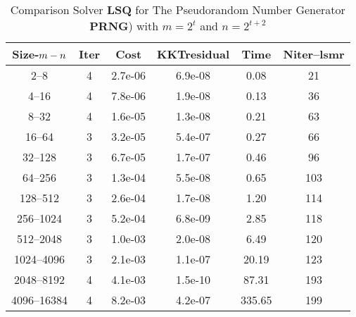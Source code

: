 \documentclass[letterpaper,12pt,oneside,final]{book}
\begin{document}
\begin{table}
\caption{Comparison Solver {\bf LSQ}  for  The Pseudorandom Number Generator {\bf PRNG}) with $m=2^{t}$ and $n=2^{t+2}$}  
\begin{center}
\begin{tabular}{|*{6}{c}|} \hline
Size-$m\--n$ & \multicolumn{1}{c}{Iter} & \multicolumn{1}{c}{Cost}& \multicolumn{1}{c}{KKTresidual} & \multicolumn{1}{c}{Time} & \multicolumn{1}{c|}{Niter--lsmr} \\ 
\hline
2--8           &4    &2.7e-06        &6.9e-08        &0.08           &21   \\ 
4--16          &4    &7.8e-06        &1.9e-08        &0.13           &36   \\ 
8--32          &4    &1.6e-05        &1.3e-08        &0.21           &63   \\ 
16--64         &3    &3.2e-05        &5.4e-07        &0.27           &66   \\ 
32--128        &3    &6.7e-05        &1.7e-07        &0.46           &96   \\ 
64--256        &3    &1.3e-04        &5.5e-08        &0.65           &103  \\ 
128--512       &3    &2.6e-04        &1.7e-08        &1.20           &114  \\ 
256--1024      &3    &5.2e-04        &6.8e-09        &2.85           &118  \\ 
512--2048      &3    &1.0e-03        &2.0e-08        &6.49           &120  \\ 
1024--4096     &3    &2.1e-03        &1.1e-07        &20.19          &123  \\ 
2048--8192     &4    &4.1e-03        &1.5e-10        &87.31          &193  \\ 
4096--16384    &4    &8.2e-03        &4.2e-07        &335.65         &199  \\
\hline
\end{tabular}
\end{center}
\end{table}
\end{document}

